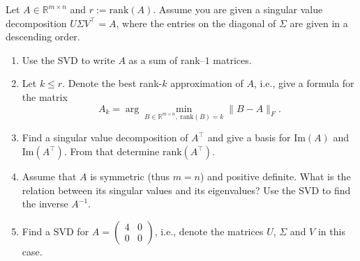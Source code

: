  Let $A \in \mathbb{R}^{m \times n}$ and $r:=\text{rank}(A)$. Assume you are given a singular value decomposition 
 $U \Sigma V^\top = A$, where the 
 entries on the diagonal of $\Sigma$ are given in a descending order.
 \begin{enumerate}
 	\item Use the SVD to write $A$ as a sum of rank--$1$ matrices.
 	\item Let $k \leq r$. Denote the best rank-$k$ approximation of $A$, i.e., give a formula for the matrix
 	$$A_k = \arg \min_{B \in  \mathbb{R}^{m \times n},~ \text{rank}(B)=k  } \|B-A\|_F.$$ 
 	\item Find a singular value decomposition of $A^\top$ and give a basis for $\text{Im}(A)$ and $\text{Im}(A^\top)$.	From that determine $\text{rank}(A^\top)$.	
 	\item Assume that $A$ is symmetric (thus $m=n$) and positive definite. What is the relation between its singular values and its eigenvalues? Use the SVD to find the inverse $A^{-1}$.%
 	 \item Find a SVD for $A = \begin{pmatrix}
 	4 & 0\\0&0
 	\end{pmatrix}$, i.e., denote the matrices $U$, $\Sigma$ and $V$ in this case.
 \end{enumerate}